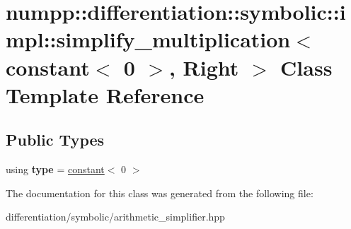 \hypertarget{classnumpp_1_1differentiation_1_1symbolic_1_1impl_1_1simplify__multiplication_3_01constant_3_010_01_4_00_01Right_01_4}{}\section{numpp\+:\+:differentiation\+:\+:symbolic\+:\+:impl\+:\+:simplify\+\_\+multiplication$<$ constant$<$ 0 $>$, Right $>$ Class Template Reference}
\label{classnumpp_1_1differentiation_1_1symbolic_1_1impl_1_1simplify__multiplication_3_01constant_3_010_01_4_00_01Right_01_4}
\subsection*{Public Types}
\begin{DoxyCompactItemize}
\item 
\mbox{\label{classnumpp_1_1differentiation_1_1symbolic_1_1impl_1_1simplify__multiplication_3_01constant_3_010_01_4_00_01Right_01_4_afc7c1fc88f08b8d9ea0fa64a7a526032}} 
using {\bfseries type} = \hyperlink{classnumpp_1_1differentiation_1_1symbolic_1_1constant}{constant}$<$ 0 $>$
\end{DoxyCompactItemize}


The documentation for this class was generated from the following file\+:\begin{DoxyCompactItemize}
\item 
differentiation/symbolic/arithmetic\+\_\+simplifier.\+hpp\end{DoxyCompactItemize}
